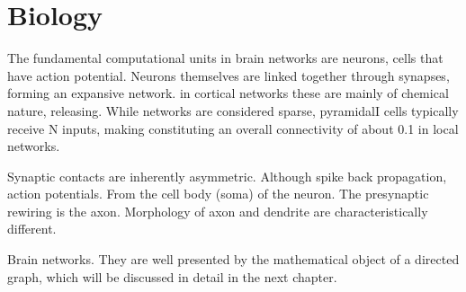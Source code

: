 \chapter{Biology}\label{ch:Biology} 



The fundamental computational units in brain networks are neurons,
cells that have action potential. Neurons themselves are linked
together through synapses, forming an expansive network. in cortical
networks these are mainly of chemical nature, releasing. While
networks are considered sparse, pyramidalI cells typically receive N
inputs, making constituting an overall connectivity of about 0.1 in
local networks.

Synaptic contacts are inherently asymmetric. Although spike back
propagation, action potentials. From the cell body (soma) of the
neuron. The presynaptic rewiring is the axon. Morphology of axon and
dendrite are characteristically different.

Brain networks. They are well presented by the mathematical object of
a directed graph, which will be discussed in detail in the next
chapter.


